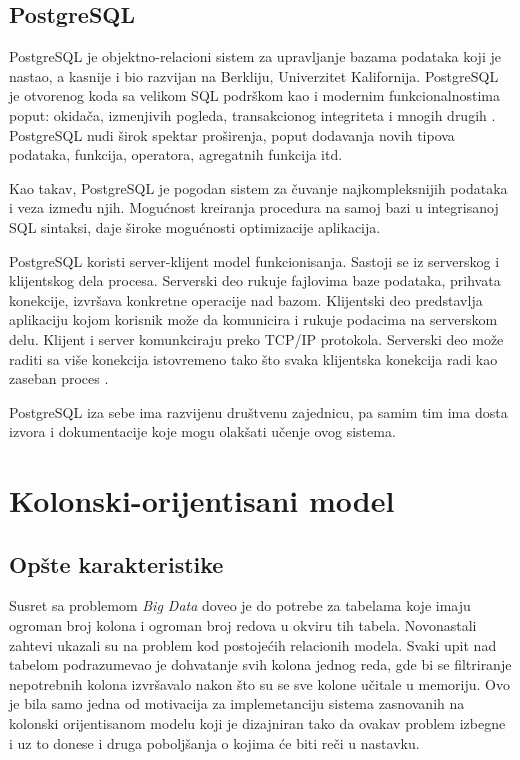 \documentclass[12pt,oneside]{memoir}
\begin{document}
\subsection{PostgreSQL}


PostgreSQL je objektno-relacioni sistem za upravljanje bazama podataka koji je nastao, a kasnije i bio razvijan na Berkliju, Univerzitet Kalifornija. PostgreSQL je otvorenog koda sa velikom SQL podrškom kao i modernim funkcionalnostima poput: okidača, izmenjivih pogleda, transakcionog integriteta i mnogih drugih \cite{PostgresHistory}. PostgreSQL nudi širok spektar proširenja, poput dodavanja novih tipova podataka, funkcija, operatora, agregatnih funkcija itd. 

Kao takav, PostgreSQL je pogodan sistem za čuvanje najkompleksnijih podataka i veza između njih. Mogućnost kreiranja procedura na samoj bazi u integrisanoj SQL sintaksi, daje široke mogućnosti optimizacije aplikacija. 

PostgreSQL koristi server-klijent model funkcionisanja. Sastoji se iz serverskog i klijentskog dela procesa. Serverski deo rukuje fajlovima baze podataka, prihvata konekcije, izvršava konkretne operacije nad bazom. Klijentski deo predstavlja aplikaciju kojom korisnik može da komunicira i rukuje podacima na serverskom delu. Klijent i server komunkciraju preko TCP/IP protokola. Serverski deo može raditi sa više konekcija istovremeno tako što svaka klijentska konekcija radi kao zaseban proces \cite{PostgreSQLUpAndRunning}.

PostgreSQL iza sebe ima razvijenu društvenu zajednicu, pa samim tim ima dosta izvora i dokumentacije koje mogu olakšati učenje ovog sistema. 

\section{Kolonski-orijentisani model}
\subsection{Opšte karakteristike}

Susret sa problemom \textit{Big Data} doveo je do potrebe za tabelama koje imaju ogroman broj kolona i ogroman broj redova u okviru tih tabela. Novonastali zahtevi ukazali su na problem kod postojećih  relacionih modela. Svaki upit nad tabelom podrazumevao je dohvatanje svih kolona jednog reda, gde bi se filtriranje nepotrebnih kolona izvršavalo nakon što su se sve kolone učitale u memoriju. Ovo je bila samo jedna od motivacija za implemetanciju sistema zasnovanih na kolonski orijentisanom modelu koji je dizajniran tako da ovakav problem izbegne i uz to donese i druga poboljšanja o kojima će biti reči u nastavku.
\end{document}
